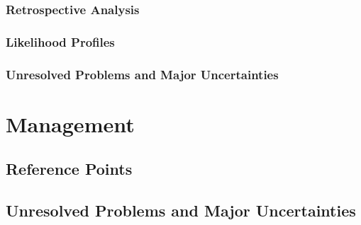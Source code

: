 \documentclass[11pt,
  english,
  a4paper,
]{article}
\begin{document}
\leavevmode\tagmcend\tagstructend


\hypertarget{retrospective-analysis}{%
\subsubsection{Retrospective Analysis}\label{retrospective-analysis}}

\leavevmode\tagmcend\tagstructend


\hypertarget{likelihood-profiles}{%
\subsubsection{Likelihood Profiles}\label{likelihood-profiles}}

\leavevmode\tagmcend\tagstructend


\hypertarget{unresolved-problems-and-major-uncertainties-1}{%
\subsubsection{Unresolved Problems and Major Uncertainties}\label{unresolved-problems-and-major-uncertainties-1}}

\leavevmode\tagmcend\tagstructend


\hypertarget{management}{%
\section{Management}\label{management}}

\leavevmode\tagmcend\tagstructend


\hypertarget{reference-points-2}{%
\subsection{Reference Points}\label{reference-points-2}}

\leavevmode\tagmcend\tagstructend


\hypertarget{unresolved-problems-and-major-uncertainties-2}{%
\subsection{Unresolved Problems and Major Uncertainties}\label{unresolved-problems-and-major-uncertainties-2}}
\end{document}
